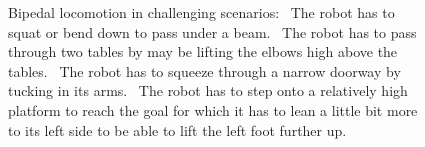 \documentclass{article}
\begin{document}
\begin{figure}[t]%
  \centering%
  \caption{%
    Bipedal locomotion in challenging scenarios: 
  ~The robot has to squat or bend down to pass under a beam.
  ~The robot has to pass through two tables by may be lifting the elbows high above the tables.
  ~The robot has to squeeze through a narrow doorway by tucking in its arms.
  ~The robot has to step onto a relatively high platform to reach the goal for which it has to lean a little bit more to its left side to be able to lift the left foot further up.
  }%
  \label{fig:biped_locomotion}%
  \vspace{-4.5mm}
\end{figure}
\end{document}

